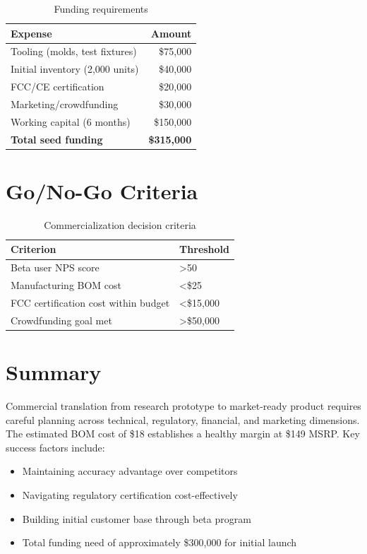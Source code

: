 \begin{table}[h]
    \centering
    \caption{Funding requirements}
    \label{tab:funding}
    \begin{tabular}{lr}
        \toprule
        \textbf{Expense} & \textbf{Amount} \\
        \midrule
        Tooling (molds, test fixtures) & \$75,000 \\
        Initial inventory (2,000 units) & \$40,000 \\
        FCC/CE certification & \$20,000 \\
        Marketing/crowdfunding & \$30,000 \\
        Working capital (6 months) & \$150,000 \\
        \midrule
        \textbf{Total seed funding} & \textbf{\$315,000} \\
        \bottomrule
    \end{tabular}
\end{table}

\section{Go/No-Go Criteria}

\begin{table}[h]
    \centering
    \caption{Commercialization decision criteria}
    \label{tab:gono_criteria}
    \begin{tabular}{p{6cm}p{5cm}}
        \toprule
        \textbf{Criterion} & \textbf{Threshold} \\
        \midrule
        Beta user NPS score & \textgreater 50 \\
        Manufacturing BOM cost & \textless \$25 \\
        FCC certification cost within budget & \textless \$15,000 \\
        Crowdfunding goal met & \textgreater \$50,000 \\
        \bottomrule
    \end{tabular}
\end{table}

\section{Summary}

Commercial translation from research prototype to market-ready product requires careful planning across technical, regulatory, financial, and marketing dimensions. The estimated BOM cost of \$18 establishes a healthy margin at \$149 MSRP. Key success factors include:
\begin{itemize}
    \item Maintaining accuracy advantage over competitors
    \item Navigating regulatory certification cost-effectively
    \item Building initial customer base through beta program
    \item Total funding need of approximately \$300,000 for initial launch
\end{itemize}

\newpage